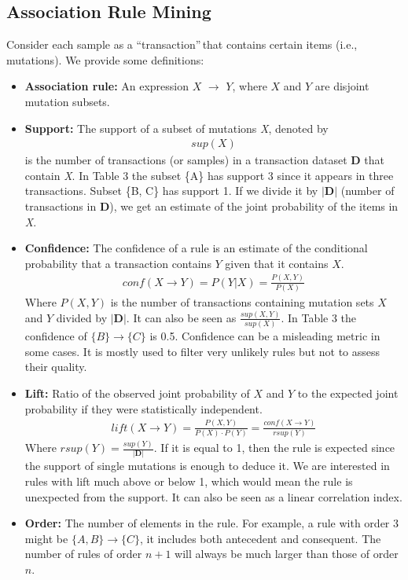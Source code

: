 \documentclass[twoside,twocolumn]{article}
\begin{document}
	\subsection{Association Rule Mining}
	Consider each sample as a \textquotedblleft transaction\textquotedblright$\,$that contains certain items (i.e., mutations). We provide some definitions:
	\begin{itemize}
		\item \textbf{Association rule:} An expression $X$ $\rightarrow$ $Y$, where $X$ and $Y$ are disjoint mutation subsets. 
		\item \textbf{Support:} The support of a subset of mutations \textit{X}, denoted by 
		\begin{align*}
			sup(X)
		\end{align*} is the number of transactions (or samples) in a transaction dataset \textbf{D} that contain \textit{X}. In Table 3 the subset \{A\} has support 3 since it appears in three transactions. Subset \{B, C\} has support 1. If we divide it by $|\mathbf{D}|$ (number of transactions in $\mathbf{D}$), we get an estimate of the joint probability of the items in \textit{X}.
		\item \textbf{Confidence:} The confidence of a rule is an estimate of the conditional probability that a transaction contains $Y$ given that it contains $X$.
		\begin{align*}
			conf(X \rightarrow Y) = P(Y|X) = \frac{P(X,Y)}{P(X)}
		\end{align*}
		Where $P(X,Y)$ is the number of transactions containing mutation sets $X$ and $Y$ divided by $|\mathbf{D}|$. It can also be seen as $\frac{sup(X,Y)}{sup(X)}$. In Table 3 the confidence of $\{B\} \rightarrow \{C\}$ is 0.5. Confidence can be a misleading metric in some cases. It is mostly used to filter very unlikely rules but not to assess their quality.
		\item \textbf{Lift:} Ratio of the observed joint probability of $X$ and $Y$ to the expected joint probability if they were statistically independent.	
		\begin{align*}
			lift(X \rightarrow Y) = \frac{P(X,Y)}{P(X)\cdot P(Y)} = \frac{conf(X\rightarrow Y)}{rsup(Y)}
		\end{align*}
		Where $rsup(Y) = \frac{sup(Y)}{|\mathbf{D}|}$. If it is equal to 1, then the rule is expected since the support of single mutations is enough to deduce it. We are interested in rules with lift much above or below 1, which would mean the rule is unexpected from the support. It can also be seen as a linear correlation index. 
		\item \textbf{Order: } The number of elements in the rule. For example, a rule with order 3 might be $\{A,B\} \rightarrow \{C\}$, it includes both antecedent and consequent. The number of rules of order $n + 1$ will always be much larger than those of order $n$.
	\end{itemize}
\end{document}
